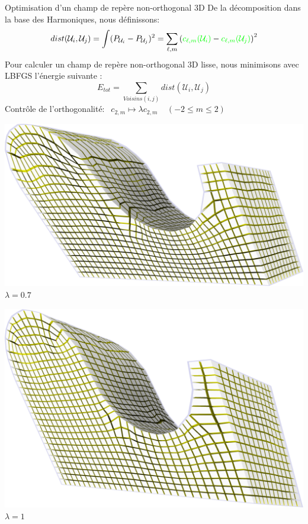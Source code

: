 \begin{frame}{Optimisation d'un champ de repère non-orthogonal 3D}
    \centering
    \footnotesize
     De la décomposition dans la base des Harmoniques, nous définissons:
    $$ dist(\mathcal{U}_i, \mathcal{U}_j) = \int (P_{\mathcal{U}_i} - P_{\mathcal{U}_j})^2 = \sum_{\ell, m} \left({\color{green}c_{\ell,m}(\mathcal{U}_i)} - {\color{green}c_{\ell,m}(\mathcal{U}_j)} \right)^2$$
    Pour calculer un champ de repère non-orthogonal 3D lisse, nous minimisons avec LBFGS l'énergie suivante :
    $$ E_{tot} = \sum_{Voisins(i, j)} dist(\mathcal{U}_i, \mathcal{U}_j)$$
    Contrôle de l'orthogonalité: $\ \ c_{2,m} \mapsto \lambda c_{2,m} \ \ \ \ \ (-2 \leq m \leq 2)$ %
    
    \begin{minipage}[b]{0.33\textwidth}
        \centering
        \includegraphics[width=\textwidth]{img_spm_ff/shear_0_7.png}
        $\lambda = 0.7$
    \end{minipage}
    \begin{minipage}[b]{0.28\textwidth}
        \centering
        \includegraphics[width=\textwidth]{img_spm_ff/shear_1.png}
        $\lambda = 1$
    \end{minipage}
    
    \normalsize
\end{frame} 
